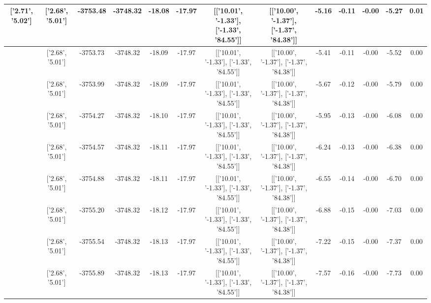 \begin{table}[htbp]
\begin{adjustbox}{angle=90}
\begin{tabular}{|c|c|c|c|c|c|c|c|c|c|c|c|c|}
 ['2.71', '5.02'] & ['2.68', '5.01'] & -3753.48 & -3748.32 & -18.08 & -17.97 & [['10.01', '-1.33'], ['-1.33', '84.55']] & [['10.00', '-1.37'], ['-1.37', '84.38']] & -5.16 & -0.11 & -0.00 & -5.27 & 0.01\\ \hline
 ['2.71', '5.02'] & ['2.68', '5.01'] & -3753.73 & -3748.32 & -18.09 & -17.97 & [['10.01', '-1.33'], ['-1.33', '84.55']] & [['10.00', '-1.37'], ['-1.37', '84.38']] & -5.41 & -0.11 & -0.00 & -5.52 & 0.00\\ \hline
 ['2.71', '5.02'] & ['2.68', '5.01'] & -3753.99 & -3748.32 & -18.09 & -17.97 & [['10.01', '-1.33'], ['-1.33', '84.55']] & [['10.00', '-1.37'], ['-1.37', '84.38']] & -5.67 & -0.12 & -0.00 & -5.79 & 0.00\\ \hline
 ['2.71', '5.02'] & ['2.68', '5.01'] & -3754.27 & -3748.32 & -18.10 & -17.97 & [['10.01', '-1.33'], ['-1.33', '84.55']] & [['10.00', '-1.37'], ['-1.37', '84.38']] & -5.95 & -0.13 & -0.00 & -6.08 & 0.00\\ \hline
 ['2.71', '5.02'] & ['2.68', '5.01'] & -3754.57 & -3748.32 & -18.11 & -17.97 & [['10.01', '-1.33'], ['-1.33', '84.55']] & [['10.00', '-1.37'], ['-1.37', '84.38']] & -6.24 & -0.13 & -0.00 & -6.38 & 0.00\\ \hline
 ['2.71', '5.02'] & ['2.68', '5.01'] & -3754.88 & -3748.32 & -18.11 & -17.97 & [['10.01', '-1.33'], ['-1.33', '84.55']] & [['10.00', '-1.37'], ['-1.37', '84.38']] & -6.55 & -0.14 & -0.00 & -6.70 & 0.00\\ \hline
 ['2.71', '5.02'] & ['2.68', '5.01'] & -3755.20 & -3748.32 & -18.12 & -17.97 & [['10.01', '-1.33'], ['-1.33', '84.55']] & [['10.00', '-1.37'], ['-1.37', '84.38']] & -6.88 & -0.15 & -0.00 & -7.03 & 0.00\\ \hline
 ['2.71', '5.02'] & ['2.68', '5.01'] & -3755.54 & -3748.32 & -18.13 & -17.97 & [['10.01', '-1.33'], ['-1.33', '84.55']] & [['10.00', '-1.37'], ['-1.37', '84.38']] & -7.22 & -0.15 & -0.00 & -7.37 & 0.00\\ \hline
 ['2.72', '5.02'] & ['2.68', '5.01'] & -3755.89 & -3748.32 & -18.13 & -17.97 & [['10.01', '-1.33'], ['-1.33', '84.55']] & [['10.00', '-1.37'], ['-1.37', '84.38']] & -7.57 & -0.16 & -0.00 & -7.73 & 0.00\\ \hline
            \end{tabular}
        \end{adjustbox}
        \caption{}
        \label{}
    \end{table}
    